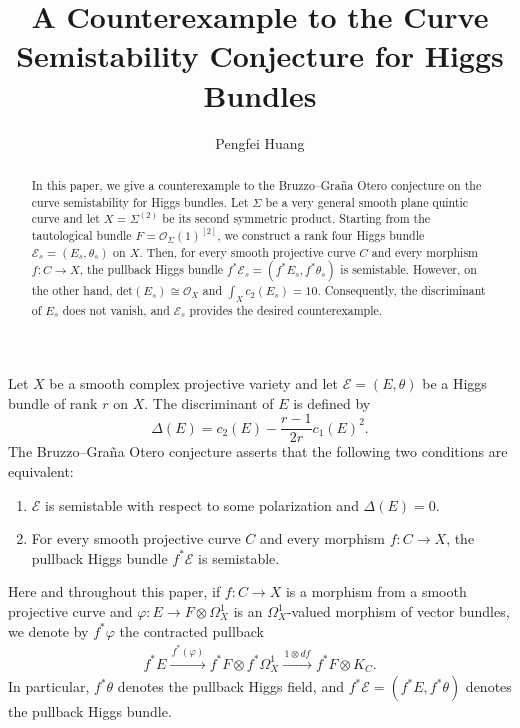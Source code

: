 \documentclass[oneside,11pt]{amsart}
\title[Bruzzo--Gra\~na Otero's curve semistability conjecture]
{A Counterexample to the Curve Semistability Conjecture for Higgs Bundles}
\author{Pengfei Huang}
\makeatletter
\theoremstyle{definition}
\theoremstyle{remark}
\let\origsection\section
\renewcommand\section{\@ifstar{\starsection}{\nostarsection}}
\newcommand\nostarsection[1]
{\sectionprelude\origsection{#1}\sectionpostlude}
\newcommand\starsection[1]
{\sectionprelude\origsection*{#1}\sectionpostlude}
\newcommand\sectionprelude{%
  \vspace{1em}
}
\newcommand\sectionpostlude{%
  \vspace{1em}
}
\numberwithin{thm}{section}
\numberwithin{equation}{section}
\makeatother
\begin{document}

\begin{abstract}
In this paper, we give a counterexample to the Bruzzo--Gra\~na Otero conjecture on the curve semistability for Higgs bundles.  Let $\Sigma$ be a very general smooth plane quintic curve and let $X=\Sigma^{(2)}$ be its second symmetric product. Starting from the tautological bundle $F=\mathcal{O}_\Sigma(1)^{[2]}$, we construct a rank four Higgs bundle $\mathcal{E}_s=(E_s,\theta_s)$ on $X$.  Then, for every smooth projective curve $C$ and every morphism $f:C\to X$, the pullback Higgs bundle $f^*\mathcal{E}_s=(f^*E_s,f^*\theta_s)$ is semistable.  However, on the other hand, $\mathrm{det}(E_s)\cong\mathcal{O}_X$ and $\int_Xc_2(E_s)=10$. Consequently, the discriminant of $E_s$ does not vanish, and $\mathcal{E}_s$ provides the desired counterexample.
\end{abstract}

\maketitle

\section{Introduction}\label{sec:introduction}

Let $X$ be a smooth complex projective variety and let
$\mathcal{E}=(E,\theta)$ be a Higgs bundle of rank $r$ on $X$.  The discriminant of $E$ is defined by
\[
 \Delta(E)=c_2(E)-\frac{r-1}{2r}c_1(E)^2.
\]
The Bruzzo--Gra\~na Otero conjecture asserts that the following two conditions are equivalent:
\begin{enumerate}
\item $\mathcal{E}$ is semistable with respect to some polarization and $\Delta(E)=0$.
\item For every smooth projective curve $C$ and every morphism
      $f:C\to X$, the pullback Higgs bundle $f^*\mathcal{E}$ is semistable.
\end{enumerate}
Here and throughout this paper, if $f:C\to X$ is a morphism from a smooth projective curve and
$\varphi: E\to F\otimes\Omega_X^1$ is an $\Omega_X^1$-valued morphism of vector bundles, we denote by $f^*\varphi$ the contracted pullback
\begin{align}\label{eq:pullback-higgs-field}
 f^*E\xrightarrow{\,f^*(\varphi)\,}
 f^*F\otimes f^*\Omega_X^1
 \xrightarrow{\,1\otimes df\,}f^*F\otimes K_C.
\end{align}
In particular, $f^*\theta$ denotes the pullback Higgs field, and $f^*\mathcal{E}=(f^*E,f^*\theta)$ denotes the pullback Higgs bundle.  
\end{document}
